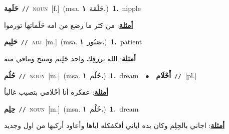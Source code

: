 \documentclass[10pt,a4paper,twoside]{article} %
\begin{document}
\begin{multicols}{2}
{\setlength\topsep{0pt}\textbf{\foreignlanguage{arabic}{حَلَمِة}}\ {\color{gray}\texttt{//}\color{black}}\ \textsc{noun}\ [f.]\ \color{gray}(msa. \foreignlanguage{arabic}{حَلَمَة}~\foreignlanguage{arabic}{\textbf{١.}})\color{black}\ \textbf{1.}~nipple\  \begin{flushright}\color{gray}\foreignlanguage{arabic}{\textbf{\underline{\foreignlanguage{arabic}{أمثلة}}}: من كثر ما رضع من امه حَلَماتها تورموا}\end{flushright}\color{black}} \vspace{2mm}

{\setlength\topsep{0pt}\textbf{\foreignlanguage{arabic}{حَلِيم}}\ {\color{gray}\texttt{//}\color{black}}\ \textsc{adj}\ [m.]\ \color{gray}(msa. \foreignlanguage{arabic}{صَبُور}~\foreignlanguage{arabic}{\textbf{١.}})\color{black}\ \textbf{1.}~patient\  \begin{flushright}\color{gray}\foreignlanguage{arabic}{\textbf{\underline{\foreignlanguage{arabic}{أمثلة}}}: الله يرزقِك واحد حَلِيم ومنيح ومافي منه}\end{flushright}\color{black}} \vspace{2mm}

{\setlength\topsep{0pt}\textbf{\foreignlanguage{arabic}{حُلُم}}\ {\color{gray}\texttt{//}\color{black}}\ \textsc{noun}\ [m.]\ \color{gray}(msa. \foreignlanguage{arabic}{حُلْم}~\foreignlanguage{arabic}{\textbf{١.}})\color{black}\ \textbf{1.}~dream\ \ $\bullet$\ \ \setlength\topsep{0pt}\textbf{\foreignlanguage{arabic}{أَحْلَام}}\ {\color{gray}\texttt{//}\color{black}}\ [pl.]\  \begin{flushright}\color{gray}\foreignlanguage{arabic}{\textbf{\underline{\foreignlanguage{arabic}{أمثلة}}}: عفكرة أنا أحْلامي بتصيب غالباً}\end{flushright}\color{black}} \vspace{2mm}

{\setlength\topsep{0pt}\textbf{\foreignlanguage{arabic}{حِلِم}}\ {\color{gray}\texttt{//}\color{black}}\ \textsc{noun}\ [m.]\ \color{gray}(msa. \foreignlanguage{arabic}{حُلْم}~\foreignlanguage{arabic}{\textbf{١.}})\color{black}\ \textbf{1.}~dream\  \begin{flushright}\color{gray}\foreignlanguage{arabic}{\textbf{\underline{\foreignlanguage{arabic}{أمثلة}}}: اجاني بالحِلِم وكان بده اياني أفكفكله اياها وأعاود أركبها من اول وجديد}\end{flushright}\color{black}} \vspace{2mm}


\end{multicols}
\end{document}

